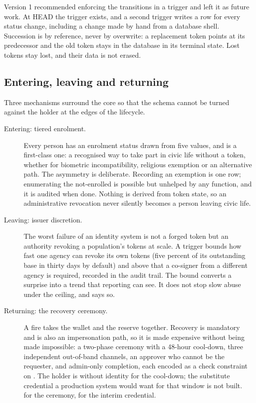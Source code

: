 Version 1 recommended enforcing the transitions in a trigger and left it as future work. At HEAD the
trigger exists, and a second trigger writes a  row for every status
change, including a change made by hand from a database shell. Succession is by reference, never by
overwrite: a replacement token points at its predecessor and the old token stays in the database in
its terminal state. Lost tokens stay lost, and their data is not erased. \sImpl

\subsection{Entering, leaving and returning}

Three mechanisms surround the core so that the schema cannot be turned against the holder at the
edges of the lifecycle.

\begin{description}
  \item[Entering: tiered enrolment.] Every person has an enrolment status drawn from five values,
    and  is a first-class one: a recognised way to take part in civic life without a
    token, whether for biometric incompatibility, religious exemption or an alternative path. The
    asymmetry is deliberate. Recording an exemption is one row; enumerating the not-enrolled is
    possible but unhelped by any function, and it is audited when done. Nothing is derived from token
    state, so an administrative revocation never silently becomes a person leaving civic life.
    \sImpl
  \item[Leaving: issuer discretion.] The worst failure of an identity system is not a forged token
    but an authority revoking a population's tokens at scale. A trigger bounds how fast one agency can
    revoke its own tokens (five percent of its outstanding base in thirty days by default) and above
    that a co-signer from a different agency is required, recorded in the audit trail. The bound
    converts a surprise into a trend that reporting can see. It does not stop slow abuse under the
    ceiling, and says so. \sImpl
  \item[Returning: the recovery ceremony.] A fire takes the wallet and the reserve together. Recovery
    is mandatory and is also an impersonation path, so it is made expensive without being made
    impossible: a two-phase ceremony with a 48-hour cool-down, three independent out-of-band channels,
    an approver who cannot be the requester, and admin-only completion, each encoded as a check
    constraint on . The holder is without identity for the cool-down; the
    substitute credential a production system would want for that window is not built. \sImpl{}
    for the ceremony, \sFut{} for the interim credential.
\end{description}

